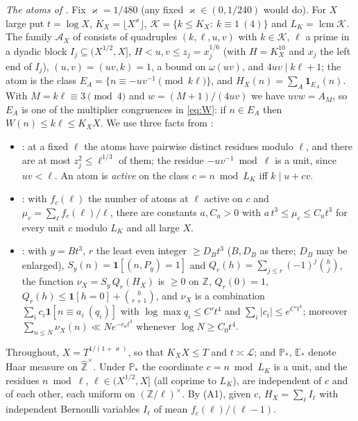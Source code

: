 \documentclass[11pt,reqno]{amsart}
\theoremstyle{definition}
\newcommand{\lcm}{\operatorname{lcm}}
\newcommand{\Lc}{\mathcal L}
\newcommand{\E}{\mathbb E}
\newcommand{\PP}{\mathbb P}
\begin{document}
\emph{The atoms of \cite{TQ}.}  Fix $\varkappa=1/480$ (any fixed
$\varkappa\in(0,1/240)$ would do).  For $X$ large put $t=\log X$,
$K_X=\lfloor X^\varkappa\rfloor$, $\mathcal K=\{k\le K_X:\ k\equiv1\ (4)\}$ and
$L_K=\lcm\mathcal K$.  The family $\mathcal A_X$ of \cite[(4)]{TQ} consists of
quadruples $(k,\ell,u,v)$ with $k\in\mathcal K$, $\ell$ a prime in a dyadic block
$I_j\subseteq(X^{1/2},X]$, $H<u,v\le z_j=x_j^{1/6}$ (with $H=K_X^{10}$ and $x_j$ the left end
of $I_j$), $(u,v)=(uv,k)=1$, a bound on $\omega(uv)$, and $4uv\mid k\ell+1$; the
atom is the class $E_A=\{n\equiv-uv^{-1}\pmod{k\ell}\}$, and
$H_X(n)=\sum_A\mathbf 1_{E_A}(n)$.  With $M=k\ell\equiv3\pmod4$ and
$w=(M+1)/(4uv)$ we have $uvw=A_M$, so $E_A$ is one of the multiplier
congruences in \eqref{eq:W}: if $n\in E_A$ then $W(n)\le k\ell\le K_XX$.  We
use three facts from \cite{TQ}:
\begin{itemize}
\item[(A1)] \cite[Lemma~2.2]{TQ}: at a fixed $\ell$ the atoms have pairwise
distinct residues modulo $\ell$, and there are at most $z_j^2\le\ell^{1/3}$ of
them; the residue $-uv^{-1}\bmod\ell$ is a unit, since $uv<\ell$.  An atom is
\emph{active} on the class $c=n\bmod L_K$ iff $k\mid u+cv$.
\item[(A2)] \cite[Cor.~4.3 and Lemma~3.2]{TQ}: with $f_c(\ell)$ the number of
atoms at $\ell$ active on $c$ and $\mu_c=\sum_\ell f_c(\ell)/\ell$, there are
constants $a,C_u>0$ with $a\,t^3\le\mu_c\le C_ut^3$ for every unit $c$ modulo $L_K$
and all large $X$.
\item[(A3)] \cite[Lemma~8.1 and Thm.~8.2]{TQ}: with $y=Bt^3$, $r$ the least even
integer $\ge D_Bt^3$ ($B,D_B$ as there; $D_B$ may be enlarged), $S_y(n)=\mathbf 1[(n,P_y)=1]$
and $Q_r(h)=\sum_{j\le r}(-1)^j\binom hj$, the function $\nu_X=S_y\,Q_r(H_X)$ is
$\ge0$ on $\mathbb Z$, $Q_r(0)=1$, $Q_r(h)\le\mathbf 1[h=0]+\binom h{r+1}$, and $\nu_X$ is a
combination $\sum_ic_i\mathbf 1[n\equiv a_i\ (q_i)]$ with $\log\max q_i\le C't^4$ and
$\sum_i|c_i|\le e^{C't^4}$; moreover $\sum_{n\le N}\nu_X(n)\ll Ne^{-c_at^3}$ whenever
$\log N\ge C_0t^4$.
\end{itemize}
Throughout, $X=T^{1/(1+\varkappa)}$, so that $K_XX\le T$ and $t\asymp\Lc$; and $\PP_*$,
$\E_*$ denote Haar measure on $\hat{\mathbb Z}^\times$.  Under $\PP_*$ the coordinate
$c=n\bmod L_K$ is a unit, and the residues $n\bmod\ell$, $\ell\in(X^{1/2},X]$ (all
coprime to $L_K$), are independent of $c$ and of each other, each uniform on
$(\mathbb Z/\ell)^\times$.  By (A1), given $c$, $H_X=\sum_\ell I_\ell$ with independent
Bernoulli variables $I_\ell$ of mean $f_c(\ell)/(\ell-1)$.
\end{document}

